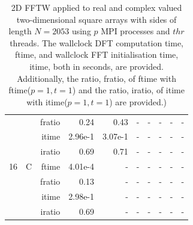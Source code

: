 \documentclass[a4paper]{article}
\begin{document}
\begin{table}[htbp]
\begin{center}
\begin{small}
\begin{tabular}{|r|r|r|r|r|r|r|r|r|r|}
             &             &  fratio &    0.24 &    0.43 &      - &      - &      - &      - &      - \\
             &             &  itime &    2.96e-1 &    3.07e-1 &      - &      - &      - &      - &      - \\
             &             &  iratio &   0.69 &    0.71 &      - &      - &      - &      - &      - \\\hline
   16 &   C &  ftime &    4.01e-4 &      - &      - &      - &      - &      - &      - \\
             &             &  fratio &    0.13 &      - &      - &      - &      - &      - &      - \\
             &             &  itime &    2.98e-1 &      - &      - &      - &      - &      - &      - \\
             &             &  iratio &   0.69 &      - &      - &      - &      - &      - &      - \\\hline       
\end{tabular}
\caption{2D FFTW applied to real and complex valued two-dimensional square arrays with sides of length $N=2053$ using $p$ MPI processes and $thr$ threads. The wallclock DFT computation time, ftime, and wallclock FFT initialisation time, itime, both in seconds, are provided. Additionally, the ratio, fratio, of ftime  with ftime($p=1,t=1$) and the ratio, iratio, of itime  with itime($p=1,t=1$) are provided.) }\label{Tbl:FFTW2d2053}
\end{small}
\end{center}
\end{table}
\end{document}
